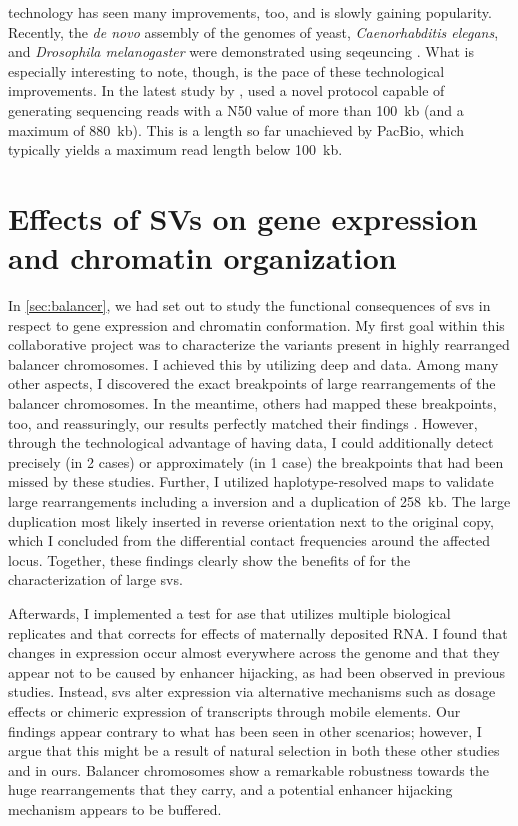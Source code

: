\ont technology has seen many improvements, too, and is slowly gaining
popularity. Recently, the \textit{de novo} assembly of the genomes of yeast,
\textit{Caenorhabditis elegans}, and \textit{Drosophila melanogaster} were
demonstrated using \ont seqeuncing \citep{Istace2017,Tyson2017,Solares2018}.
What is especially interesting to note, though, is the pace of these technological
improvements. In the latest study by \ont, \citet{Jain2018} used a novel protocol
capable of generating sequencing reads with a N50 value of more than 100~kb
(and a maximum of 880~kb). This is a length so far unachieved by PacBio, which
typically yields a maximum read length below 100~kb.





\section{Effects of SVs on gene expression and chromatin organization}

In \cref{sec:balancer}, we had set out to study the functional consequences of
\acp{sv} in respect to gene expression and chromatin conformation. My first goal
within this collaborative project was to characterize the variants present in
highly rearranged balancer chromosomes. I achieved this by utilizing deep \wgs
and \hic data. Among many other aspects, I discovered the exact breakpoints of
large rearrangements of the balancer chromosomes. In the meantime, others had
mapped these breakpoints, too, and reassuringly, our results perfectly matched
their findings \citep{Miller2016,Miller2018}. However, through the technological
advantage of having \hic data, I could additionally detect precisely (in 2
cases) or approximately (in 1 case) the breakpoints that had been missed by
these studies. Further, I utilized haplotype-resolved \hic maps to validate
large rearrangements including a inversion and a duplication of 258~kb. The
large duplication most likely inserted in reverse orientation next to the
original copy, which I concluded from the differential contact frequencies
around the affected locus. Together, these findings clearly show the benefits
of \hic for the characterization of large \acp{sv}.

Afterwards, I implemented a
test for \acl{ase} that utilizes multiple biological replicates and that
corrects for effects of maternally deposited RNA. I found that changes in
expression occur almost everywhere across the genome and that they appear not to
be caused by enhancer hijacking, as had been observed in previous studies.
Instead, \acp{sv} alter expression via alternative mechanisms such as dosage
effects or chimeric expression of transcripts through mobile elements. Our
findings appear contrary to what has been seen in other scenarios; however, I
argue that this might be a result of natural selection in both these other
studies and in ours. Balancer chromosomes show a remarkable robustness towards
the huge rearrangements that they carry, and a potential enhancer hijacking
mechanism appears to be buffered.

